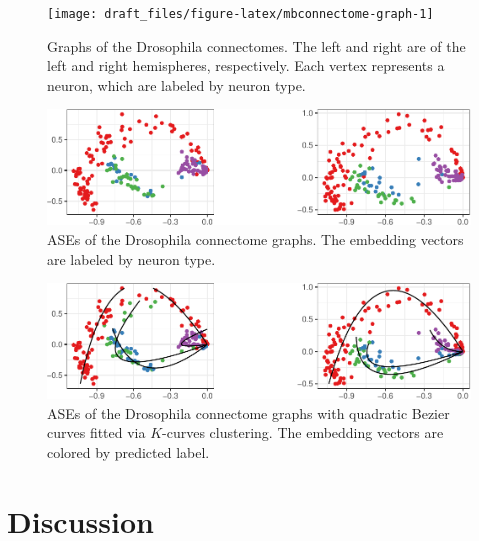 \documentclass[
  12pt,
]{article}
\theoremstyle{definition}
\theoremstyle{definition}
\theoremstyle{definition}
\theoremstyle{definition}
\theoremstyle{remark}
\begin{document}
\begin{figure}[H]

{\centering \texttt{[image: draft\_files/figure-latex/mbconnectome-graph-1]} 

}

\caption{Graphs of the Drosophila connectomes. The left and right are of the left and right hemispheres, respectively. Each vertex represents a neuron, which are labeled by neuron type.}\label{fig:mbconnectome-graph}
\end{figure}

\begin{figure}[H]

{\centering \includegraphics{draft_files/figure-latex/mbconnectome-ase-1} 

}

\caption{ASEs of the Drosophila connectome graphs. The embedding vectors are labeled by neuron type.}\label{fig:mbconnectome-ase}
\end{figure}

\begin{figure}[H]

{\centering \includegraphics{draft_files/figure-latex/mbconnectome-kcurves-1} 

}

\caption{ASEs of the Drosophila connectome graphs with quadratic Bezier curves fitted via $K$-curves clustering. The embedding vectors are colored by predicted label.}\label{fig:mbconnectome-kcurves}
\end{figure}

\newpage

\hypertarget{sec:comparison}{%
\section{Discussion}\label{sec:comparison}}
\end{document}
